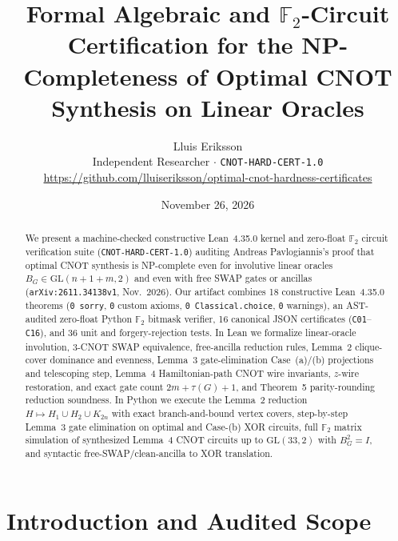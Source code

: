 \documentclass[10pt,twocolumn]{article}
\title{\textbf{Formal Algebraic and $\mathbb{F}_2$-Circuit Certification for the NP-Completeness of Optimal CNOT Synthesis on Linear Oracles}}
\author{Lluis Eriksson\\
\small Independent Researcher \quad $\cdot$ \quad \texttt{CNOT-HARD-CERT-1.0}\\
\small \url{https://github.com/lluiseriksson/optimal-cnot-hardness-certificates}}
\date{November 26, 2026}
\begin{document}
\maketitle

\begin{abstract}
We present a machine-checked constructive Lean~4.35.0 kernel and zero-float $\mathbb{F}_2$ circuit verification suite (\texttt{CNOT-HARD-CERT-1.0}) auditing Andreas Pavlogiannis's proof that optimal CNOT synthesis is NP-complete even for involutive linear oracles $B_G \in \mathrm{GL}(n+1+m, 2)$ and even with free SWAP gates or ancillas (\texttt{arXiv:2611.34138v1}, Nov.\ 2026). Our artifact combines 18 constructive Lean~4.35.0 theorems (\texttt{0 sorry}, \texttt{0} custom axioms, \texttt{0 Classical.choice}, \texttt{0} warnings), an AST-audited zero-float Python $\mathbb{F}_2$ bitmask verifier, 16 canonical JSON certificates (\texttt{C01}--\texttt{C16}), and 36 unit and forgery-rejection tests. In Lean we formalize linear-oracle involution, 3-CNOT SWAP equivalence, free-ancilla reduction rules, Lemma~2 clique-cover dominance and evenness, Lemma~3 gate-elimination Case~(a)/(b) projections and telescoping step, Lemma~4 Hamiltonian-path CNOT wire invariants, $z$-wire restoration, and exact gate count $2m + \tau(G) + 1$, and Theorem~5 parity-rounding reduction soundness. In Python we execute the Lemma~2 reduction $H \mapsto H_1 \cup H_2 \cup K_{2n}$ with exact branch-and-bound vertex covers, step-by-step Lemma~3 gate elimination on optimal and Case-(b) XOR circuits, full $\mathbb{F}_2$ matrix simulation of synthesized Lemma~4 CNOT circuits up to $\mathrm{GL}(33,2)$ with $B_G^2 = I$, and syntactic free-SWAP/clean-ancilla to XOR translation.
\end{abstract}

\section{Introduction and Audited Scope}
\end{document}

